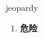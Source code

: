 
\begin{frame}
{\huge jeopardy}
\begin{center}
\begin{enumerate}\Large
  \item \textbf{危险}
\end{enumerate}
\end{center}
\end{frame}
